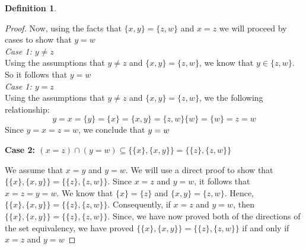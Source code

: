 \documentclass{book}
\theoremstyle{definition}
\newtheorem{definition}{Definition}[section]
\theoremstyle{remark}
\begin{document}
\begin{definition}
\begin{proof}
        Now, using the facts that $\{x,y\} = \{z,w\}$ and  $x=z$ we will proceed by cases to show that $y=w$ \\
        
            \textit{Case 1: $y \neq z$} \\
                Using the assumptions that $y \neq z$ and $\{x,y\} = \{z,w\}$, we know that $y \in \{z,w \}$. So it follows that $y = w$ \\ 
            
            \textit{Case 1: $y = z$} \\
                Using the assumptions that $y \neq z$ and $\{x,y\} = \{z,w\}$, we the following relationship: 
                    \begin{equation*}
                          y = x = \{y \} = \{x\} = \{x,y\} = \{z,w\} \{w\} = \{w\} = z = w
                    \end{equation*}
                Since $y = x = z = w$, we conclude that $y = w  \\
                $
    \begin{flushleft} \textbf{Case 2: $(x=z) \cap (y=w) \subseteq \{ \{ x \}, \{ x, y \} \} =  \{ \{ z \}, \{ z, w \} \}$} \end{flushleft}
    
        We assume that $x=y$ and $y=w$. We will use a direct proof to show that $\{ \{ x \}, \{ x, y \} \} =  \{ \{ z \}, \{ z, w \} \}$. Since $x=z$ and $y=w$, it follows that $x=z=y=w$. We know that $\{x \} = \{z \}$ and $\{x,y \} = \{z,w \}$. Hence, $\{ \{ x \}, \{ x, y \} \} =  \{ \{ z \}, \{ z, w \} \}$. Consequently, if $x=z$ and $y=w$, then $\{ \{ x \}, \{ x, y \} \} =  \{ \{ z \}, \{ z, w \} \}$.
    Since, we have now proved both of the directions of the set equivalency, we have proved $\{ \{ x \}, \{ x, y \} \} =  \{ \{ z \}, \{ z, w \} \}$ if and only if $x=z$ and $y=w$
\end{proof}
\end{definition}
\end{document}
